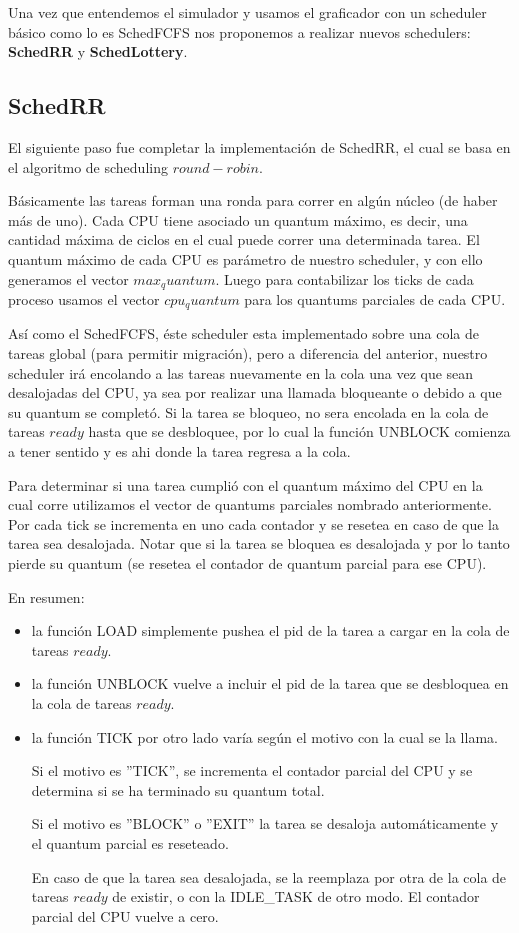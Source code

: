 Una vez que entendemos el simulador y usamos el graficador con un scheduler básico como lo es SchedFCFS nos proponemos a realizar nuevos schedulers: \textbf{SchedRR} y \textbf{SchedLottery}.

\subsection{SchedRR}

El siguiente paso fue completar la implementación de SchedRR, el cual se basa en el algoritmo de scheduling $round-robin$. 

Básicamente las tareas forman una ronda para correr en algún núcleo (de haber más de uno). Cada CPU tiene asociado un quantum máximo, es decir, una cantidad máxima de ciclos en el cual puede correr una determinada tarea. El quantum máximo de cada CPU es parámetro de nuestro scheduler, y con ello generamos el vector $max_quantum$. Luego para contabilizar los ticks de cada proceso usamos el vector $cpu_quantum$ para los quantums parciales de cada CPU.

Así como el SchedFCFS, éste scheduler esta implementado sobre una cola de tareas global (para permitir migración), pero a diferencia del anterior, nuestro scheduler irá encolando a las tareas nuevamente en la cola una vez que sean desalojadas del CPU, ya sea por realizar una llamada bloqueante o debido a que su quantum se completó. Si la tarea se bloqueo, no sera encolada en la cola de tareas $ready$ hasta que se desbloquee, por lo cual la función UNBLOCK comienza a tener sentido y es ahi donde la tarea regresa a la cola.

Para determinar si una tarea cumplió con el quantum máximo del CPU en la cual corre utilizamos el vector de quantums parciales nombrado anteriormente. Por cada tick se incrementa en uno cada contador y se resetea en caso de que la tarea sea desalojada. Notar que si la tarea se bloquea es desalojada y por lo tanto pierde su quantum (se resetea el contador de quantum parcial para ese CPU).

En resumen:
\begin{itemize}
	\item la función LOAD simplemente pushea el pid de la tarea a cargar en la cola de tareas $ready$. 
	\item la función UNBLOCK vuelve a incluir el pid de la tarea que se desbloquea en la cola de tareas $ready$.
	\item la función TICK por otro lado varía según el motivo con la cual se la llama. 

Si el motivo es ''TICK'', se incrementa el contador parcial del CPU y se determina si se ha terminado su quantum total. 
	
Si el motivo es ''BLOCK'' o ''EXIT'' la tarea se desaloja automáticamente y el quantum parcial es reseteado.

En caso de que la tarea sea desalojada, se la reemplaza por otra de la cola de tareas $ready$ de existir, o con la IDLE\_TASK de otro modo. El contador parcial del CPU vuelve a cero.

\end{itemize}


